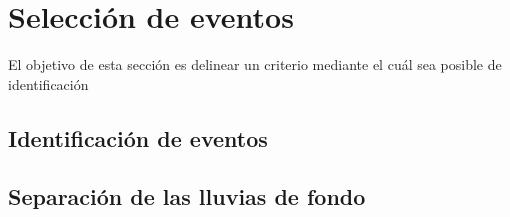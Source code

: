 \chapter{Selecci\'on de eventos}
\label{ch:seleccionRadio}

El objetivo de esta sección es delinear un criterio mediante el cuál sea posible de identificación 

\section{Identificaci\'on de eventos}

\section{Separaci\'on de las lluvias de fondo}